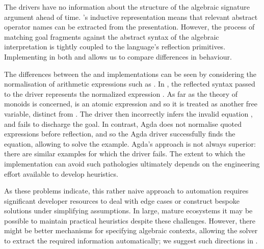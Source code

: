 
The drivers have no information about the structure of the algebraic
signature argument ahead of time. \Frexlib{}'s inductive \Term{}
representation means that relevant abstract operator names can be
extracted from the presentation.
%
However, the process of matching goal fragments against the abstract
syntax of the algebraic interpretation is tightly coupled to the
language's reflection primitives. Implementing \Frexlib{} in both
\idris{} and \agda{} allows us to compare differences in behaviour.

The differences between the \idris{} and \agda{} implementations can
be seen by considering the normalisation of arithmetic expressions
such as \ExOne{}.
%
In \idris{}, the reflected syntax passed to the driver represents the
normalized expression \ExTwo{}.
%
As far as the theory of monoids is concerned, \ReflectionSY{} is an atomic
expression and so it is treated as another free variable, distinct
from \ReflectionY{}. The \idris{} driver then incorrectly infers the
invalid equation \ExThree{}, and fails to discharge the goal.
%
In contrast, Agda does not normalise quoted expressions before
reflection, and so the Agda driver successfully finds the equation,
allowing \Frexlib{} to solve the example.
%
Agda's approach is not always superior: there are
similar examples for which the \agda{} driver fails.  The extent to which
the implementation can avoid such pathologies ultimately depends on
the engineering effort available to develop heuristics.

As these problems indicate, this rather naive approach to automation
requires significant developer resources to deal with edge cases or
construct bespoke solutions under simplifying assumptions.
%
In large, mature ecosystems it may be possible to maintain practical
heuristics despite these challenges.
%
However, there might be better mechanisms for specifying
algebraic contexts, allowing the solver to extract the required
information automatically; we suggest such directions in
.
